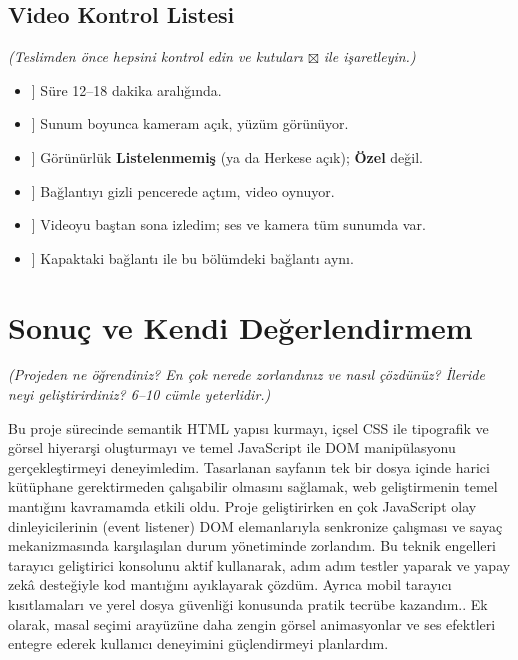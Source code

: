 \documentclass[12pt,a4paper]{article}
\newcommand{\aciklama}[1]{{\color{gray}\itshape (#1)}}
\begin{document}
\subsection{Video Kontrol Listesi}
\aciklama{Teslimden önce hepsini kontrol edin ve kutuları $\boxtimes$ ile işaretleyin.}
\begin{itemize}
  \item[[X]] Süre 12--18 dakika aralığında.
  \item[[X]] Sunum boyunca kameram açık, yüzüm görünüyor.
  \item[[X]] Görünürlük \textbf{Listelenmemiş} (ya da Herkese açık); \textbf{Özel} değil.
  \item[[X]] Bağlantıyı gizli pencerede açtım, video oynuyor.
  \item[[X]] Videoyu baştan sona izledim; ses ve kamera tüm sunumda var.
  \item[[X]] Kapaktaki bağlantı ile bu bölümdeki bağlantı aynı.
\end{itemize}

\section{Sonuç ve Kendi Değerlendirmem}
\aciklama{Projeden ne öğrendiniz? En çok nerede zorlandınız ve nasıl çözdünüz? İleride
neyi geliştirirdiniz? 6--10 cümle yeterlidir.}

Bu proje sürecinde semantik HTML yapısı kurmayı, içsel CSS ile tipografik ve görsel hiyerarşi oluşturmayı ve temel JavaScript ile DOM manipülasyonu gerçekleştirmeyi deneyimledim. Tasarlanan sayfanın tek bir dosya içinde harici kütüphane gerektirmeden çalışabilir olmasını sağlamak, web geliştirmenin temel mantığını kavramamda etkili oldu. Proje geliştirirken en çok JavaScript olay dinleyicilerinin (event listener) DOM elemanlarıyla senkronize çalışması ve sayaç mekanizmasında karşılaşılan durum yönetiminde zorlandım. Bu teknik engelleri tarayıcı geliştirici konsolunu aktif kullanarak, adım adım testler yaparak ve yapay zekâ desteğiyle kod mantığını ayıklayarak çözdüm. Ayrıca mobil tarayıcı kısıtlamaları ve yerel dosya güvenliği konusunda pratik tecrübe kazandım.. Ek olarak, masal seçimi arayüzüne daha zengin görsel animasyonlar ve ses efektleri entegre ederek kullanıcı deneyimini güçlendirmeyi planlardım.

\end{document}
